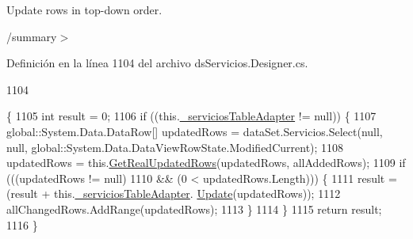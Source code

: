 Update rows in top-\/down order. 

/summary$>$ 

Definición en la línea 1104 del archivo ds\-Servicios.\-Designer.\-cs.


\begin{DoxyCode}
1104                                                                                                            
                                                                                                                  
          \{
1105             \textcolor{keywordtype}{int} result = 0;
1106             \textcolor{keywordflow}{if} ((this.\hyperlink{class_proyecto___integrador__3_1_1ds_servicios_table_adapters_1_1_table_adapter_manager_ac26b431a74f60f4ba1f8cc57cb5e75e2}{\_serviciosTableAdapter} != null)) \{
1107                 global::System.Data.DataRow[] updatedRows = dataSet.Servicios.Select(null, null, 
      global::System.Data.DataViewRowState.ModifiedCurrent);
1108                 updatedRows = this.\hyperlink{class_proyecto___integrador__3_1_1ds_servicios_table_adapters_1_1_table_adapter_manager_a32c8e4d34a932fd8b581e954c7e50376}{GetRealUpdatedRows}(updatedRows, allAddedRows);
1109                 \textcolor{keywordflow}{if} (((updatedRows != null) 
1110                             && (0 < updatedRows.Length))) \{
1111                     result = (result + this.\hyperlink{class_proyecto___integrador__3_1_1ds_servicios_table_adapters_1_1_table_adapter_manager_ac26b431a74f60f4ba1f8cc57cb5e75e2}{\_serviciosTableAdapter}.
      \hyperlink{class_proyecto___integrador__3_1_1ds_servicios_table_adapters_1_1_servicios_table_adapter_aeef3160a3e0bdc86f499f0f9ad7221fd}{Update}(updatedRows));
1112                     allChangedRows.AddRange(updatedRows);
1113                 \}
1114             \}
1115             \textcolor{keywordflow}{return} result;
1116         \}
\end{DoxyCode}


